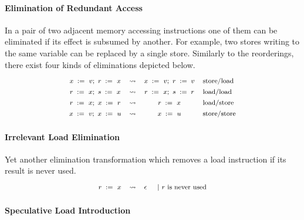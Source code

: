 \paragraph{Elimination of Redundant Access} 

In a pair of two adjacent memory accessing instructions 
one of them can be eliminated if its effect 
is subsumed by another. 
For example, two stores writing to the same variable 
can be replaced by a single store.  
Similarly to the reorderings, there exist four kinds 
of eliminations depicted below. 
%
\[\def\arraystretch{1.4}\footnotesize
  \begin{array}{cccl} 

      \writeInst{}{x}{v} \seq \readInst{}{r}{x} 
    & \leadsto 
    & \writeInst{}{x}{v} \seq \assignInst{r}{v}
    & \text{store/load}  \\ 

      \readInst{}{r}{x} \seq \readInst{}{s}{x} 
    & \leadsto 
    & \readInst{}{r}{x} \seq \assignInst{s}{r}
    & \text{load/load}  \\ 

      \readInst{}{r}{x} \seq \writeInst{}{x}{r} 
    & \leadsto 
    & \readInst{}{r}{x} 
    & \text{load/store}  \\ 

      \writeInst{}{x}{v} \seq \writeInst{}{x}{u} 
    & \leadsto 
    & \writeInst{}{x}{u}
    & \text{store/store}  \\ 

  \end{array}
\]

\paragraph{Irrelevant Load Elimination}

Yet another elimination transformation 
which removes a load instruction if its 
result is never used. 
%
\[\def\arraystretch{1.4}\footnotesize
  \begin{array}{cccl} 

      \readInst{}{r}{x} 
    & \leadsto 
    & \epsInst
    & ~|~ \text{$r$ is never used}  \\ 

  \end{array}
\]

\paragraph{Speculative Load Introduction}

